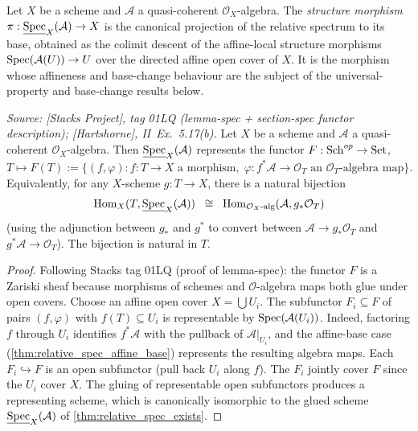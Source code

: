 \begin{definition}
  \leanok
  \label{def:relspec_structure_morphism}
  Let \(X\) be a scheme and \(\mathcal{A}\) a quasi-coherent \(\mathcal{O}_X\)-algebra.
  The \emph{structure morphism}
  \(\pi : \underline{\operatorname{Spec}}_X(\mathcal{A}) \to X\) is the canonical projection of the
  relative spectrum to its base, obtained as the colimit descent of the affine-local
  structure morphisms \(\operatorname{Spec}(\mathcal{A}(U)) \to U\) over the directed affine open
  cover of \(X\). It is the morphism whose affineness and base-change behaviour are the
  subject of the universal-property and base-change results below.
\end{definition}

\begin{theorem}
  \label{thm:relative_spec_univ}
  \textit{Source: [Stacks Project], tag 01LQ (lemma-spec + section-spec
  functor description); [Hartshorne], II~Ex.~5.17(b).}
  Let \(X\) be a scheme and \(\mathcal{A}\) a quasi-coherent \(\mathcal{O}_X\)-algebra.
  Then \(\underline{\operatorname{Spec}}_X(\mathcal{A})\) represents the functor
  \(F : \operatorname{Sch}^{op} \to \mathrm{Set}\),
  $T \mapsto F(T) := \{(f, \varphi) : f : T \to X \text{ a morphism},\;
  \varphi : f^* \mathcal{A} \to \mathcal{O}_T \text{ an } \mathcal{O}_T\text{-algebra map}\}.$
  Equivalently, for any \(X\)-scheme \(g : T \to X\),
  there is a natural bijection
  \[
    \operatorname{Hom}_X(T, \underline{\operatorname{Spec}}_X(\mathcal{A})) \;\;\cong\;\;
    \operatorname{Hom}_{\mathcal{O}_X\text{-alg}}(\mathcal{A}, g_* \mathcal{O}_T)
  \]
  (using the adjunction between \(g_*\) and \(g^*\) to convert between
  \(\mathcal{A} \to g_*\mathcal{O}_T\) and \(g^*\mathcal{A} \to \mathcal{O}_T\)).
  The bijection is natural in \(T\).
\end{theorem}

\begin{proof}
  Following Stacks tag 01LQ (proof of lemma-spec): the functor \(F\) is a Zariski sheaf
  because morphisms of schemes and \(\mathcal{O}\)-algebra maps both glue under open covers.
  Choose an affine open cover \(X = \bigcup U_i\). The subfunctor
  \(F_i \subseteq F\) of pairs \((f, \varphi)\) with \(f(T) \subseteq U_i\) is representable by
  \(\operatorname{Spec}(\mathcal{A}(U_i))\). Indeed, factoring \(f\) through \(U_i\) identifies
  \(f^*\mathcal{A}\) with the pullback of \(\mathcal{A}|_{U_i}\), and the affine-base
  case (\cref{thm:relative_spec_affine_base}) represents the resulting algebra maps.
  Each \(F_i \hookrightarrow F\) is an open
  subfunctor (pull back \(U_i\) along \(f\)). The \(F_i\) jointly cover \(F\) since the \(U_i\)
  cover \(X\). The gluing of representable open subfunctors produces a representing scheme,
  which is canonically isomorphic to the glued scheme \(\underline{\operatorname{Spec}}_X(\mathcal{A})\)
  of \cref{thm:relative_spec_exists}.
\end{proof}

